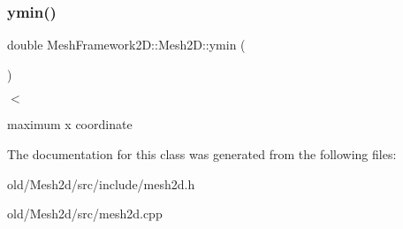 \subsubsection{\texorpdfstring{ymin()}{ymin()}}
{\footnotesize\ttfamily double Mesh\+Framework2\+D\+::\+Mesh2\+D\+::ymin (\begin{DoxyParamCaption}{ }\end{DoxyParamCaption})\hspace{0.3cm}{\ttfamily [inline]}}



$<$ 

maximum x coordinate 

The documentation for this class was generated from the following files\+:\begin{DoxyCompactItemize}
\item 
old/\+Mesh2d/src/include/mesh2d.\+h\item 
old/\+Mesh2d/src/mesh2d.\+cpp\end{DoxyCompactItemize}
